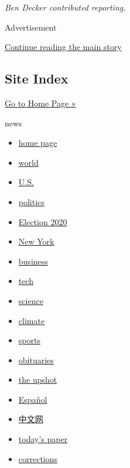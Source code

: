 \emph{Ben Decker contributed reporting.}

Advertisement

\protect\hyperlink{after-bottom}{Continue reading the main story}

\hypertarget{site-index}{%
\subsection{Site Index}\label{site-index}}

\href{/web/20200206210009/https://www.nytimes.com/}{Go to Home Page »}

news

\begin{itemize}
\tightlist
\item
  \href{https://web.archive.org/web/20200206210009/https://www.nytimes.com/}{home
  page}
\item
  \href{https://web.archive.org/web/20200206210009/https://www.nytimes.com/section/world}{world}
\item
  \href{https://web.archive.org/web/20200206210009/https://www.nytimes.com/section/us}{U.S.}
\item
  \href{https://web.archive.org/web/20200206210009/https://www.nytimes.com/section/politics}{politics}
\item
  \href{https://web.archive.org/web/20200206210009/https://www.nytimes.com/news-event/2020-election}{Election
  2020}
\item
  \href{https://web.archive.org/web/20200206210009/https://www.nytimes.com/section/nyregion}{New
  York}
\item
  \href{https://web.archive.org/web/20200206210009/https://www.nytimes.com/section/business}{business}
\item
  \href{https://web.archive.org/web/20200206210009/https://www.nytimes.com/section/technology}{tech}
\item
  \href{https://web.archive.org/web/20200206210009/https://www.nytimes.com/section/science}{science}
\item
  \href{https://web.archive.org/web/20200206210009/https://www.nytimes.com/section/climate}{climate}
\item
  \href{https://web.archive.org/web/20200206210009/https://www.nytimes.com/section/sports}{sports}
\item
  \href{https://web.archive.org/web/20200206210009/https://www.nytimes.com/section/obituaries}{obituaries}
\item
  \href{https://web.archive.org/web/20200206210009/https://www.nytimes.com/section/upshot}{the
  upshot}
\item
  \href{https://web.archive.org/web/20200206210009/https://www.nytimes.com/es/}{Español}
\item
  \href{https://web.archive.org/web/20200206210009/https://cn.nytimes.com/}{中文网}
\item
  \href{https://web.archive.org/web/20200206210009/https://www.nytimes.com/section/todayspaper}{today's
  paper}
\item
  \href{https://web.archive.org/web/20200206210009/https://www.nytimes.com/section/corrections}{corrections}
\end{itemize}

